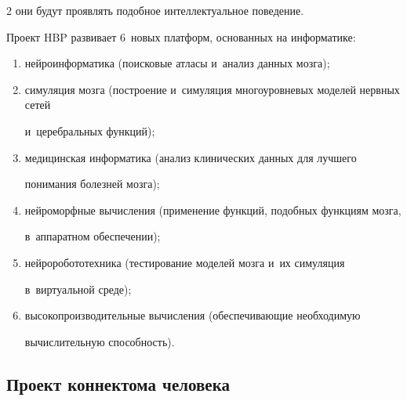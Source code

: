 \begin{multicols}{2}
они будут проявлять подобное интеллектуальное поведение.





  Проект HBP развивает 6~новых платформ, основанных на информатике: 


  \begin{enumerate}[(1)]


\item нейроинформатика (поисковые атласы и~анализ данных мозга);\\[-15pt]


\item симуляция мозга (построение и~симуляция многоуровневых моделей нервных сетей 


и~церебральных функций);\\[-15pt]


\item медицинская информатика (анализ клинических данных для лучшего 


понимания болезней мозга);\\[-15pt]


\item нейроморфные вычисления (применение функций, подобных функциям мозга, 


в~аппаратном обеспечении);\\[-15pt]


\item нейроробототехника (тестирование моделей мозга и~их симуляция 


в~виртуальной среде);\\[-15pt]


\item высокопроизводительные вычисления (обеспечивающие необходимую 


вычислительную способность).


\end{enumerate}





\vspace*{-12pt}





\subsection{Проект коннектома человека}


  



\end{multicols}
